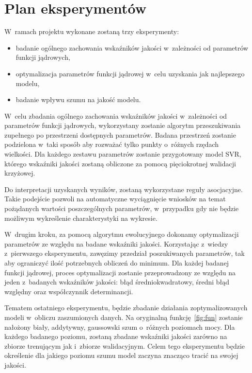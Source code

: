 \section{Plan eksperymentów}
W~ramach projektu wykonane zostaną trzy eksperymenty:
\begin{itemize}
    \item badanie ogólnego zachowania wskaźników jakości w~zależności od parametrów funkcji jądrowych,
    \item optymalizacja parametrów funkcji jądrowej w~celu uzyskania jak najlepszego modelu,
    \item badanie wpływu szumu na jakość modelu.
\end{itemize}

W~celu zbadania ogólnego zachowania wskaźników jakości w~zależności od parametrów funkcji jądrowych, wykorzystany zostanie algorytm przeszukiwania zupełnego po przestrzeni dostępnych parametrów. Badana przestrzeń zostanie podzielona w~taki sposób aby rozważać tylko punkty o~różnych rzędach wielkości. Dla każdego zestawu parametrów zostanie przygotowany model SVR, którego wskaźniki jakości zostaną obliczone za pomocą pięciokrotnej walidacji krzyżowej.

Do interpretacji uzyskanych wyników, zostaną wykorzystane reguły asocjacyjne. Takie podejście pozwoli na automatyczne wyciągnięcie wniosków na temat pożądanych wartości poszczególnych parametrów, w~przypadku gdy nie będzie możliwym wykreślenie charakterystyki na wykresie.

W~drugim kroku, za pomocą algorytmu ewolucyjnego dokonamy optymalizacji parametrów ze względu na badane wskaźniki jakości. Korzystając z~wiedzy z~pierwszego eksperymentu, zawęzimy przedział poszukiwanych parametrów, tak aby ograniczyć ilość potrzebnych obliczeń do minimum. Dla każdej badanej funkcji jądrowej, proces optymalizacji zostanie przeprowadzony ze względu na jeden z~badanych wskaźników jakości: błąd średniokwadratowy, średni błąd względny oraz współczynnik determinancji.

Tematem ostatniego eksperymentu, będzie zbadanie działania zoptymalizowanych modeli w~obliczu zaszumionych danych. Na oryginalną funkcję~\ref{fig:fun} zostanie nałożony biały, addytywny, gaussowski szum o~różnych poziomach mocy. Dla każdego badanego poziomu, zostaną zbadane wskaźniki jakości zarówno na zbiorze trenującym jak i~zbiorze walidacyjnym. Celem tego eksperymentu będzie określenie dla jakiego poziomu szumu model zaczyna znacząco tracić na swojej jakości.

